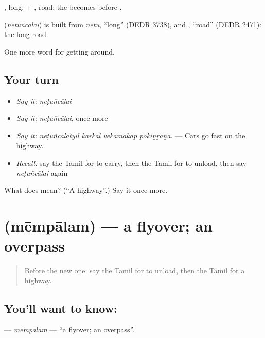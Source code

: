 , long, + , road: the  becomes  before .

\begin{cousinweb}
\textbf{} (\emph{neṭuñcālai}) is built from \emph{neṭu}, \textquotedblleft{}long\textquotedblright{} (DEDR 3738), and , \textquotedblleft{}road\textquotedblright{} (DEDR 2471): the long road.
\end{cousinweb}

\begin{grammarlens}[title={What you've built}]
One more word for getting around.
\end{grammarlens}

\subsection*{Your turn}
\begin{itemize}
\raggedright
  \item \emph{Say it:} \emph{neṭuñcālai}
  \item \emph{Say it:} \emph{neṭuñcālai}, once more
  \item \emph{Say it:} \emph{neṭuñcālaiyil kārkaḷ vēkamākap pōkiṉṟaṉa.} — Cars go fast on the highway.
  \item \emph{Recall:} say the Tamil for to carry, then the Tamil for to unload, then say \emph{neṭuñcālai} again
\end{itemize}

\begin{tcolorbox}[breakable,colback=teal!4,colframe=teal!35!black,title={Before you move on}]
What does  mean? (\textquotedblleft{}A highway\textquotedblright{}.) Say it once more.
\end{tcolorbox}
\section[\texorpdfstring{\ta{மேம்பாலம்} (mēmpālam)}{மேம்பாலம் (mēmpālam)}]{ (mēmpālam) — a flyover; an overpass}

\label{lesson:TA-C403-mempalam}



\begin{quote}
Before the new one: say the Tamil for to unload, then the Tamil for a highway.
\end{quote}

\subsection*{You'll want to know: }
\textbf{} — \emph{mēmpālam} — \textquotedblleft{}a flyover; an overpass\textquotedblright{}.

